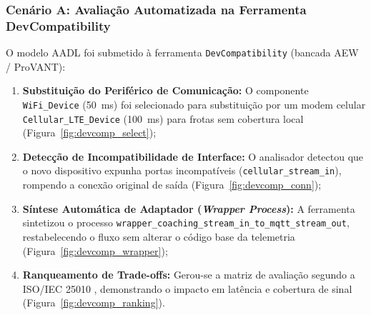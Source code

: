 \subsubsection{Cenário A: Avaliação Automatizada na Ferramenta DevCompatibility}
O modelo AADL foi submetido à ferramenta \texttt{DevCompatibility} (bancada AEW / ProVANT):
\begin{enumerate}
    \item \textbf{Substituição do Periférico de Comunicação:} O componente \texttt{WiFi\_Device} (50~ms) foi selecionado para substituição por um modem celular \texttt{Cellular\_LTE\_Device} (100~ms) para frotas sem cobertura local (Figura~\ref{fig:devcomp_select});
    \item \textbf{Detecção de Incompatibilidade de Interface:} O analisador detectou que o novo dispositivo expunha portas incompatíveis (\texttt{cellular\_stream\_in}), rompendo a conexão original de saída (Figura~\ref{fig:devcomp_conn});
    \item \textbf{Síntese Automática de Adaptador (\textit{Wrapper Process}):} A ferramenta sintetizou o processo \texttt{wrapper\_coaching\_stream\_in\_to\_mqtt\_stream\_out}, restabelecendo o fluxo sem alterar o código base da telemetria (Figura~\ref{fig:devcomp_wrapper});
    \item \textbf{Ranqueamento de Trade-offs:} Gerou-se a matriz de avaliação segundo a ISO/IEC 25010 \cite{iso25010}, demonstrando o impacto em latência e cobertura de sinal (Figura~\ref{fig:devcomp_ranking}).
\end{enumerate}

